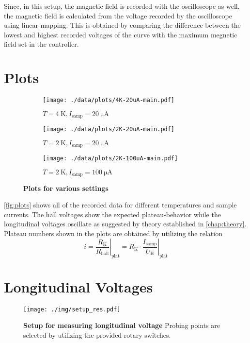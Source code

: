 Since, in this setup, the magnetic field is recorded with the oscilloscope as well, the magnetic field is calculated from the voltage recorded by the oscilloscope using linear mapping.
This is obtained by comparing the difference between the lowest and highest recorded voltages of the curve with the maximum megnetic field set in the controller.

\section{Plots}\label{sec:plots}
\begin{figure}
	\centering
	\begin{subfigure}{.48\textwidth}
		\centering
		\texttt{[image: ./data/plots/4K-20uA-main.pdf]}
		\caption{$T=\SI{4}{\kelvin}, I_\text{samp} = \SI{20}{\micro\ampere}$}
	\end{subfigure}
	\hspace*{\fill}
	\begin{subfigure}{.48\textwidth}
		\centering
		\texttt{[image: ./data/plots/2K-20uA-main.pdf]}
		\caption{$T=\SI{2}{\kelvin}, I_\text{samp} = \SI{20}{\micro\ampere}$}
	\end{subfigure}
	\hspace*{\fill}
	\begin{subfigure}{.48\textwidth}
		\centering
		\texttt{[image: ./data/plots/2K-100uA-main.pdf]}
		\caption{$T=\SI{2}{\kelvin}, I_\text{samp} = \SI{100}{\micro\ampere}$}
	\end{subfigure}
	\hspace*{\fill}
	\caption[Plots for various settings]{\textbf{Plots for various settings}}
	\label{fig:plots}
\end{figure}
\autoref{fig:plots} shows all of the recorded data for different temperatures and sample currents.
The hall voltages show the expected plateau-behavior while the longitudinal voltages oscillate as suggested by theory established in \autoref{chap:theory}.
Plateau numbers shown in the plots are obtained by utilizing the relation
\begin{equation*}
	i = \left. \frac{R_\text{K}}{R_\text{hall}} \right\rvert_{\text{plat}} = R_\text{K}\cdot\left. \frac{I_\text{samp}}{U_\text{H}}\right\rvert_{\text{plat}}
\end{equation*}

\section{Longitudinal Voltages}
\begin{figure}
	\centering
	\texttt{[image: ./img/setup\_res.pdf]}
	\caption[Setup for measuring longitudinal voltage]{\textbf{Setup for measuring longitudinal voltage} Probing points are selected by utilizing the provided rotary switches.}
	\label{fig:setup_long_don_jon}
\end{figure}

